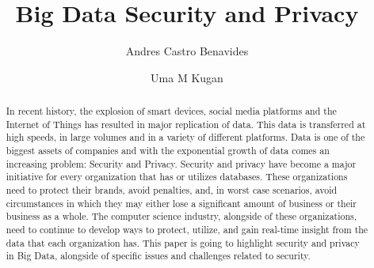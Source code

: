 \documentclass[sigconf]{acmart}
\begin{document}
\title{Big Data Security and Privacy}

\author{Andres Castro Benavides}

\author{Uma M Kugan}
\renewcommand{\shortauthors}{Uma Kugan, Andres Castro}

\begin{abstract}
In recent history, the explosion of smart devices, social media platforms and the Internet of Things has resulted in major replication of data.  This data is transferred at high speeds, in large volumes and in a variety of different platforms. Data is one of the biggest assets of companies and with the exponential growth of data comes an increasing problem: Security and Privacy. Security and privacy have become a major initiative for every organization that has or utilizes databases.  These organizations need to protect their brands, avoid penalties, and, in worst case scenarios, avoid circumstances in which they may either lose a significant amount of business or their business as a whole. The computer science industry, alongside of these organizations, need to continue to develop ways to protect, utilize, and gain real-time insight from the data that each organization has. This paper is going to highlight security and privacy in Big Data, alongside of specific issues and challenges related to security.
\end{abstract}


\maketitle
\end{document}
